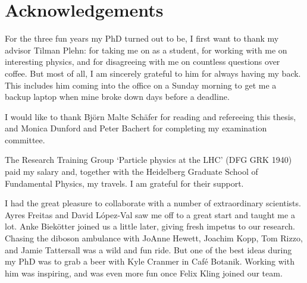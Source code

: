 
\chapter*{Acknowledgements}




For the three fun years my PhD turned out to be, I first want to
thank my advisor Tilman Plehn: for taking me on as a student, for
working with me on interesting physics, and for disagreeing with me on
countless questions over coffee. But most of all, I am sincerely
grateful to him for always having my back. This includes him coming
into the office on a Sunday morning to get me a backup laptop when
mine broke down days before a deadline.
%
%
%

I would like to thank Bj\"orn Malte Sch\"afer for reading and
refereeing this thesis, and Monica Dunford and Peter Bachert for
completing my examination committee.
%

The Research Training Group `Particle physics at the LHC' (DFG GRK
1940) paid my salary and, together with the Heidelberg Graduate School
of Fundamental Physics, my travels. I am grateful for their support.

I had the great pleasure to collaborate with a number of extraordinary
scientists. Ayres Freitas and David L\'opez-Val saw me off to a great
start and taught me a lot. Anke Biek\"otter joined us a little later,
giving fresh impetus to our research. Chasing the diboson ambulance
with JoAnne Hewett, Joachim Kopp, Tom Rizzo, and Jamie Tattersall was
a wild and fun ride. But one of the best ideas during my PhD was to
grab a beer with Kyle Cranmer in Caf\'e Botanik. Working with him was
inspiring, and was even more fun once Felix Kling joined our team.

